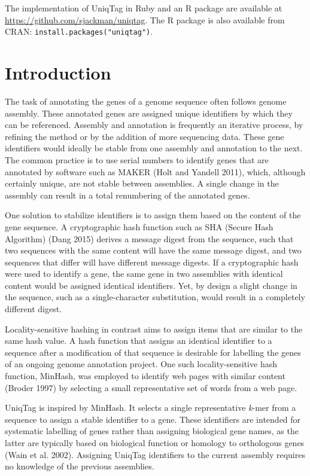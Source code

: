 \documentclass[
  12pt,
  oneside,
  openany]{book}
\begin{document}
The implementation of UniqTag in Ruby and an R package are available at \url{https://github.com/sjackman/uniqtag}. The R package is also available from CRAN: \texttt{install.packages("uniqtag")}.

\hypertarget{introduction-2}{%
\section{Introduction}\label{introduction-2}}

The task of annotating the genes of a genome sequence often follows genome assembly. These annotated genes are assigned unique identifiers by which they can be referenced. Assembly and annotation is frequently an iterative process, by refining the method or by the addition of more sequencing data. These gene identifiers would ideally be stable from one assembly and annotation to the next. The common practice is to use serial numbers to identify genes that are annotated by software such as MAKER (Holt and Yandell 2011), which, although certainly unique, are not stable between assemblies. A single change in the assembly can result in a total renumbering of the annotated genes.

One solution to stabilize identifiers is to assign them based on the content of the gene sequence. A cryptographic hash function such as SHA (Secure Hash Algorithm) (Dang 2015) derives a message digest from the sequence, such that two sequences with the same content will have the same message digest, and two sequences that differ will have different message digests. If a cryptographic hash were used to identify a gene, the same gene in two assemblies with identical content would be assigned identical identifiers. Yet, by design a slight change in the sequence, such as a single-character substitution, would result in a completely different digest.

Locality-sensitive hashing in contrast aims to assign items that are similar to the same hash value. A hash function that assigns an identical identifier to a sequence after a modification of that sequence is desirable for labelling the genes of an ongoing genome annotation project. One such locality-sensitive hash function, MinHash, was employed to identify web pages with similar content (Broder 1997) by selecting a small representative set of words from a web page.

UniqTag is inspired by MinHash. It selects a single representative \emph{k}-mer from a sequence to assign a stable identifier to a gene. These identifiers are intended for systematic labelling of genes rather than assigning biological gene names, as the latter are typically based on biological function or homology to orthologous genes (Wain et al. 2002). Assigning UniqTag identifiers to the current assembly requires no knowledge of the previous assemblies.
\end{document}
